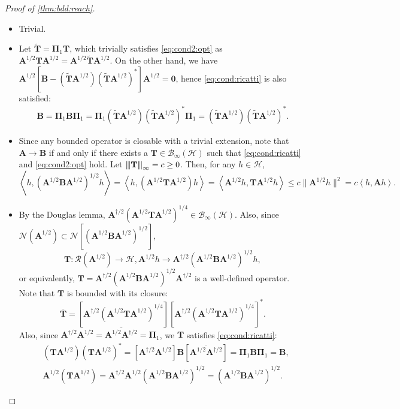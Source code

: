 \documentclass[noinfoline]{imsart}\setcounter{tocdepth}{2}
\newcommand{\m}[1]{\mathbf{#1}} %
\renewcommand{\c}[1]{\mathcal{#1}} %
\newcommand{\innpr}[2]{{\left\langle {#1},{#2}\right\rangle}} %
\newcommand{\vertiii}[1]{{\left\vert\kern-0.25ex\left\vert\kern-0.25ex\left\vert #1 
    \right\vert\kern-0.25ex\right\vert\kern-0.25ex\right\vert}} %
\theoremstyle{plain}
\begin{document}
\begin{proof}[Proof of \cref{thm:bdd:reach}] \quad
\begin{itemize}
\item [($1 \Rightarrow 3)$] Trivial.
\item [($3 \Rightarrow 1)$] Let $\tilde{\m{T}} = \m{\Pi}_{1} \m{T}$, which trivially satisfies \eqref{eq:cond2:opt} as $\m{A}^{1/2} \m{T} \m{A}^{1/2} = \m{A}^{1/2} \tilde{\m{T}} \m{A}^{1/2}$. On the other hand, we have $\m{A}^{1/2}[\m{B} - (\tilde{\m{T}} \m{A}^{1/2}) (\tilde{\m{T}} \m{A}^{1/2})^{*}] \m{A}^{1/2} = \m{0}$,
hence \eqref{eq:cond:ricatti} is also satisfied:
\begin{align*}
    \m{B} = \m{\Pi}_{1} \m{B} \m{\Pi}_{1} =
    \m{\Pi}_{1} (\tilde{\m{T}} \m{A}^{1/2}) (\tilde{\m{T}} \m{A}^{1/2})^{*} \m{\Pi}_{1}  = (\tilde{\m{T}} \m{A}^{1/2}) (\tilde{\m{T}} \m{A}^{1/2})^{*}.
\end{align*}

\item [($1 \Rightarrow 2)$] Since any bounded operator is closable with a trivial extension, note that $\m{A} \to \m{B}$ if and only if there exists a $\m{T} \in \c{B}_{\infty} (\c{H})$ such that \eqref{eq:cond:ricatti} and \eqref{eq:cond2:opt} hold. Let $\vertiii{\m{T}}_{\infty} = c \ge 0$. Then, for any $h \in \c{H}$,
\begin{equation*}
    \innpr{h}{(\m{A}^{1/2} \m{B} \m{A}^{1/2})^{1/2} h} = \innpr{h}{(\m{A}^{1/2} \m{T} \m{A}^{1/2}) h} = \innpr{\m{A}^{1/2} h}{\m{T} \m{A}^{1/2} h} \le c \|\m{A}^{1/2} h\|^{2} = c \innpr{h}{\m{A} h}.
\end{equation*}

\item [($2 \Rightarrow 1)$] By the Douglas lemma, $\m{A}^{\dagger/2} (\m{A}^{1/2} \m{T} \m{A}^{1/2})^{1/4} \in \c{B}_{\infty}(\c{H})$. Also, since $\c{N}(\m{A}^{1/2}) \subset \c{N}[(\m{A}^{1/2} \m{B} \m{A}^{1/2})^{1/2}]$,
\begin{equation*}
    \m{T}: \c{R}(\m{A}^{1/2}) \rightarrow \c{H}, \m{A}^{1/2} h \rightarrow \m{A}^{\dagger/2} (\m{A}^{1/2} \m{B} \m{A}^{1/2})^{1/2} h,
\end{equation*}
or equivalently, $\m{T} = \m{A}^{\dagger/2} (\m{A}^{1/2} \m{B} \m{A}^{1/2})^{1/2} \m{A}^{\dagger/2}$ is a well-defined operator. Note that $\m{T}$ is bounded with its closure:
\begin{equation*}
    \overline{\m{T}} = [\m{A}^{\dagger/2} (\m{A}^{1/2} \m{T} \m{A}^{1/2})^{1/4}] [\m{A}^{\dagger/2} (\m{A}^{1/2} \m{T} \m{A}^{1/2})^{1/4}]^{*}.
\end{equation*}
Also, since $\m{A}^{\dagger/2} \m{A}^{1/2} = \overline{\m{A}^{1/2} \m{A}^{\dagger/2}} = \m{\Pi}_{1}$, we $\m{T}$
satisfies \eqref{eq:cond:ricatti}:
\begin{align*}
    &(\m{T} \m{A}^{1/2}) (\m{T} \m{A}^{1/2})^{*} = [\m{A}^{\dagger/2} \m{A}^{1/2}] \m{B} [\overline{\m{A}^{1/2} \m{A}^{\dagger/2}}] = \m{\Pi}_{1} \m{B} \m{\Pi}_{1} = \m{B}, \\
    &\m{A}^{1/2} (\m{T} \m{A}^{1/2}) = \m{A}^{\dagger/2} \m{A}^{1/2} (\m{A}^{1/2} \m{B} \m{A}^{1/2})^{1/2} = (\m{A}^{1/2} \m{B} \m{A}^{1/2})^{1/2}.
\end{align*}
\end{itemize}


\end{proof}
\end{document}
